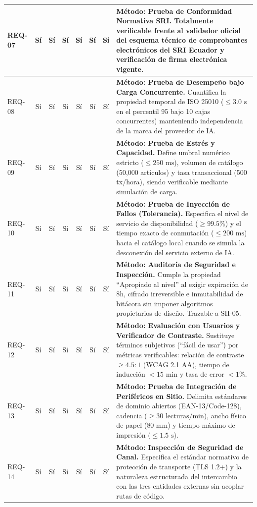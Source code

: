 \documentclass[conference,10pt]{IEEEtran}
\begin{document}
\begin{table}[htbp]
\begin{tabularx}{\textwidth}{l c c c c c c Y}
			\midrule
			REQ-07 & Sí & Sí & Sí & Sí & Sí & Sí & \textbf{Método: Prueba de Conformidad Normativa SRI.} Totalmente verificable frente al validador oficial del esquema técnico de comprobantes electrónicos del SRI Ecuador y verificación de firma electrónica vigente. \\
			\midrule
			REQ-08 & Sí & Sí & Sí & Sí & Sí & Sí & \textbf{Método: Prueba de Desempeño bajo Carga Concurrente.} Cuantifica la propiedad temporal de ISO 25010 ($\le 3.0\text{ s}$ en el percentil 95 bajo 10 cajas concurrentes) manteniendo independencia de la marca del proveedor de IA. \\
			\midrule
			REQ-09 & Sí & Sí & Sí & Sí & Sí & Sí & \textbf{Método: Prueba de Estrés y Capacidad.} Define umbral numérico estricto ($\le 250\text{ ms}$), volumen de catálogo (50,000 artículos) y tasa transaccional (500 tx/hora), siendo verificable mediante simulación de carga. \\
			\midrule
			REQ-10 & Sí & Sí & Sí & Sí & Sí & Sí & \textbf{Método: Prueba de Inyección de Fallos (Tolerancia).} Especifica el nivel de servicio de disponibilidad ($\ge 99.5\%$) y el tiempo exacto de conmutación ($\le 200\text{ ms}$) hacia el catálogo local cuando se simula la desconexión del servicio externo de IA. \\
			\midrule
			REQ-11 & Sí & Sí & Sí & Sí & Sí & Sí & \textbf{Método: Auditoría de Seguridad e Inspección.} Cumple la propiedad ``Apropiado al nivel'' al exigir expiración de 8h, cifrado irreversible e inmutabilidad de bitácora sin imponer algoritmos propietarios de diseño. Trazable a SH-05. \\
			\midrule
			REQ-12 & Sí & Sí & Sí & Sí & Sí & Sí & \textbf{Método: Evaluación con Usuarios y Verificador de Contraste.} Sustituye términos subjetivos (``fácil de usar'') por métricas verificables: relación de contraste $\ge 4.5:1$ (WCAG 2.1 AA), tiempo de inducción $< 15\text{ min}$ y tasa de error $< 1\%$. \\
			\midrule
			REQ-13 & Sí & Sí & Sí & Sí & Sí & Sí & \textbf{Método: Prueba de Integración de Periféricos en Sitio.} Delimita estándares de dominio abiertos (EAN-13/Code-128), cadencia ($\ge 30\text{ lecturas/min}$), ancho físico de papel (80 mm) y tiempo máximo de impresión ($\le 1.5\text{ s}$). \\
			\midrule
			REQ-14 & Sí & Sí & Sí & Sí & Sí & Sí & \textbf{Método: Inspección de Seguridad de Canal.} Especifica el estándar normativo de protección de transporte (TLS 1.2+) y la naturaleza estructurada del intercambio con las tres entidades externas sin acoplar rutas de código. \\

\end{tabularx}
\end{table}
\end{document}
